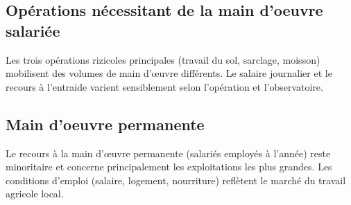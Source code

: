\documentclass[
  french,
  letterpaper,
]{report}
\begin{document}
\subsection{Opérations nécessitant de la main d'oeuvre
salariée}\label{opuxe9rations-nuxe9cessitant-de-la-main-doeuvre-salariuxe9e}

Les trois opérations rizicoles principales (travail du sol, sarclage,
moisson) mobilisent des volumes de main d'œuvre différents. Le salaire
journalier et le recours à l'entraide varient sensiblement selon
l'opération et l'observatoire.

\begin{table}

\caption{\label{tbl-operations-mo}Main d'œuvre salariée et entraide par
opération agricole}


\end{table}%

\subsection{Main d'oeuvre permanente}\label{main-doeuvre-permanente}

Le recours à la main d'œuvre permanente (salariés employés à l'année)
reste minoritaire et concerne principalement les exploitations les plus
grandes. Les conditions d'emploi (salaire, logement, nourriture)
reflètent le marché du travail agricole local.
\end{document}
